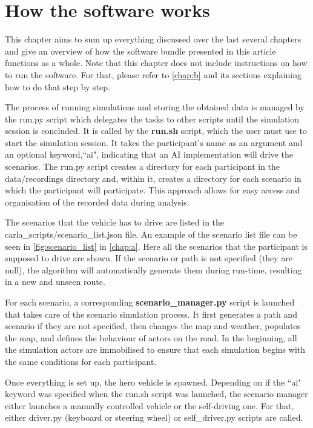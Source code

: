 \chapter{How the software works} \label{chap:eight}

This chapter aims to sum up everything discussed over the last several chapters and give an overview of how the software bundle presented in this article functions as a whole. Note that this chapter does not include instructions on how to run the software. For that, please refer to \autoref{chap:b} and its sections explaining how to do that step by step.

The process of running simulations and storing the obtained data is managed by the run.py script which delegates the tasks to other scripts until the simulation session is concluded. It is called by the \textbf{run.sh} script, which the user must use to start the simulation session. It takes the participant's name as an argument and an optional keyword,``ai", indicating that an AI implementation will drive the scenarios. The run.py script creates a directory for each participant in the data/recordings directory and, within it, creates a directory for each scenario in which the participant will participate. This approach allows for easy access and organisation of the recorded data during analysis.

The scenarios that the vehicle has to drive are listed in the carla\_scripts/scenario\_list.json file. An example of the scenario list file can be seen in \autoref{fig:scenario_list} in \autoref{chap:a}. Here all the scenarios that the participant is supposed to drive are shown. If the scenario or path is not specified (they are null), the algorithm will automatically generate them during run-time, resulting in a new and unseen route. 

For each scenario, a corresponding \textbf{scenario\_manager.py} script is launched that takes care of the scenario simulation process. It first generates a path and scenario if they are not specified, then changes the map and weather, populates the map, and defines the behaviour of actors on the road. In the beginning, all the simulation actors are immobilised to ensure that each simulation begins with the same conditions for each participant.

Once everything is set up, the hero vehicle is spawned. Depending on if the ``ai" keyword was specified when the run.sh script was launched, the scenario manager either launches a manually controlled vehicle or the self-driving one. For that, either driver.py (keyboard or steering wheel) or self\_driver.py scripts are called.

